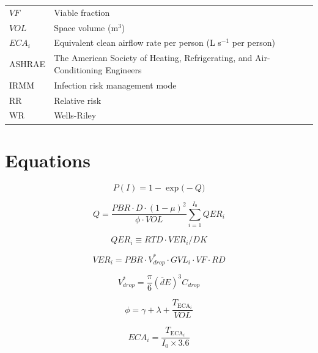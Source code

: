 \documentclass[12pt]{article}
\begin{document}
\begin{tabular}{ll}
$VF$             & Viable fraction \\
$VOL$            & Space volume (m$^3$) \\
$ECA_i$          & Equivalent clean airflow rate per person (L s$^{-1}$ per person) \\
ASHRAE           & The American Society of Heating, Refrigerating, and Air-Conditioning Engineers \\
IRMM             & Infection risk management mode \\
RR               & Relative risk \\
WR               & Wells-Riley \\
\end{tabular}






\section*{Equations}

\begin{equation}
P(I) = 1 - \exp\bigl(-Q\bigr)
\tag{1}
\end{equation}

\begin{equation}
Q = \frac{PBR \cdot D \cdot (1 - \mu)^2}{\phi \cdot VOL} \sum_{i=1}^{I_0} QER_i
\tag{2}
\end{equation}

\begin{equation}
QER_i \equiv RTD \cdot VER_i / DK
\tag{3}
\end{equation}

\begin{equation}
VER_i = PBR \cdot V^{*}_{drop} \cdot GVL_i \cdot VF \cdot RD
\tag{4}
\end{equation}

\begin{equation}
V^{*}_{drop} = \frac{\pi}{6} \left( \overline{d}E \right)^3 C_{drop}
\tag{5}
\end{equation}

\begin{equation}
\phi = \gamma + \lambda + \frac{T_{\text{ECA}_i}}{VOL}
\tag{6}
\end{equation}

\begin{equation}
ECA_i = \frac{T_{\text{ECA}_i}}{I_0 \times 3.6}
\tag{7}
\end{equation}
\end{document}
